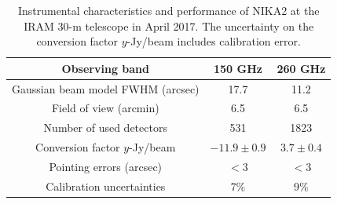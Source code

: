 \documentclass[traditabstract]{aa}
\begin{document}
\begin{table}[t]
\begin{center}
\begin{tabular}{ccc}
\hline
\hline
Observing band & 150 GHz & 260 GHz \\
\hline
Gaussian beam model FWHM (arcsec) & 17.7 & 11.2 \\
Field of view (arcmin) & 6.5 & 6.5 \\
Number of used detectors & 531 & 1823 \\
Conversion factor $y$-Jy/beam & $-11.9\pm 0.9$ & $3.7\pm 0.4$ \\
Pointing errors (arcsec) & $<3$ & $<3$ \\
Calibration uncertainties & 7\% & 9\% \\
\hline
\hline
\end{tabular}
\end{center}
\caption{{\footnotesize Instrumental characteristics and performance of NIKA2 at the IRAM 30-m telescope in April 2017. The uncertainty on the conversion factor $y$-Jy/beam includes calibration error.}}
\label{tab:NIKA2_instru}
\end{table}
\end{document}
